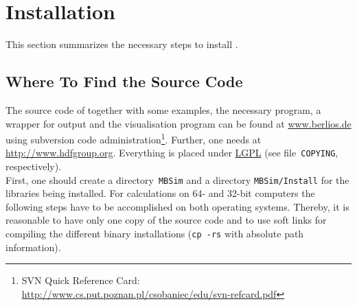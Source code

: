\section{Installation}
This section summarizes the necessary steps to install \MBSim{} \cite{Foer06}.

\subsection{Where To Find the Source Code}
The source code of \MBSim{} together with some examples, the necessary \FMatVec{} program, a \HDF{} wrapper for output and the visualisation program \OpenMBV{} can be found at \url{www.berlios.de} using subversion code administration\footnote{SVN Quick Reference Card: \url{http://www.cs.put.poznan.pl/csobaniec/edu/svn-refcard.pdf}}. Further, one needs \HDF{} at \url{http://www.hdfgroup.org}. Everything is placed under \href{http://www.gnu.org/licenses/lgpl.html}{LGPL} (see file~\texttt{COPYING}, respectively).\\
First, one should create a directory~\texttt{MBSim} and a directory \texttt{MBSim/Install} for the libraries being installed. For calculations on 64- and 32-bit computers the following steps have to be accomplished on both operating systems. Thereby, it is reasonable to have only one copy of the source code and to use soft links for compiling the different binary installations (\texttt{cp -rs} with absolute path information).

